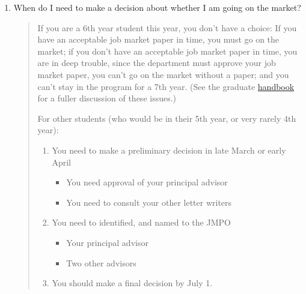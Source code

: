 \documentclass{\classes/econtex}
\providecommand\phantomsection{}
\begin{document}
\begin{enumerate}
\begin{quote}
    \ifdvi\phantomsection\hypertarget{DecideByWhen}{}\fi
    
  \end{quote}

\item  When do I need to make a decision about whether I am going on
  the market?

  \begin{quote}
    If you are a 6th year student this year, you don't have a choice: If
    you have an acceptable job market paper in time, you must go on the
    market; if you don't have an acceptable job market paper in time, you
    are in deep trouble, since the department must approve your job market
    paper, you can't go on the market without a paper; and you can't stay
    in the program for a 7th year.  (See the graduate \href{http://www.econ2.jhu.edu/pdf/Econ\_Grad\_Handbook.pdf}{handbook} for a fuller discussion of these issues.) 

    For other students (who would be in their 5th year, or very rarely 4th year):

    \begin{enumerate}
    \item You need to make a preliminary decision in late March or early April
      \begin{itemize}
      \item You need approval of your principal advisor
      \item You need to consult your other letter writers
      \end{itemize}
    \item You need to identified, and named to the JMPO
      \begin{itemize}
      \item Your principal advisor
      \item Two other advisors
      \end{itemize}
    \item You should make a final decision by July 1.  
    \end{enumerate}
    
    \begin{comment}

      In the dept meeting on 2006-10-17 a question was raised about
      whether we are really serious about our policy, as stated by Larry,
      that ``there is no such thing as a 7th year student.''  

      The answer is yes.

      There was then some discussion about the relationship between going
      on the job market and remaining in the program, caused by the fact
      that there are currently three students (Tereanu, Svitil, Lu) who
      are clearly not ready for the job market but have not given up all
      hope of finishing a dissertation by August of next year.


\end{comment}
\end{quote}
\end{enumerate}
\end{document}
